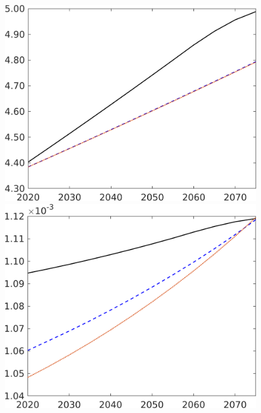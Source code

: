 \begin{figure}[h!!]
\begin{minipage}[]{0.32\textwidth}
	\end{minipage}
	\begin{minipage}[]{0.32\textwidth}
		\includegraphics[width=1\textwidth]{../../codding_model/own_basedOnFried/optimalPol_elastS_DisuSci/figures/all_1705/An_CompEffOPT_NOT_NoTaus_spillover0_noskill1_sep1_BN0_ineq0_red0_etaa0.79_lgd0.png}
	\end{minipage}
	\begin{minipage}[]{0.32\textwidth}
		\includegraphics[width=1\textwidth]{../../codding_model/own_basedOnFried/optimalPol_elastS_DisuSci/figures/all_1705/Lg_CompEffOPT_NOT_NoTaus_spillover0_noskill1_sep1_BN0_ineq0_red0_etaa0.79_lgd0.png}

\end{minipage}
\end{figure}
